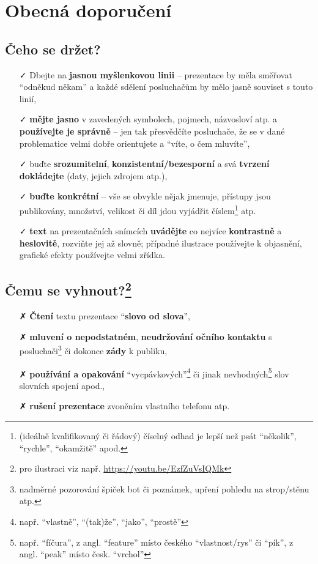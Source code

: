 \documentclass[a4paper,11pt, twoside]{report}
\begin{document}
\section{Obecná doporučení}

\raggedbottom

\subsection*{Čeho se držet?}

\begin{itemize}
\item[\faCheck]
Dbejte na \textbf{jasnou myšlenkovou linii} -- prezentace by měla směřovat ``odněkud někam'' a 
každé sdělení posluchačům by mělo jasně souviset s touto linií,
\item[\faCheck]
\textbf{mějte jasno} v zavedených symbolech, pojmech, názvosloví atp. a \textbf{používejte je správně} -- jen tak 
přesvědčíte posluchače, že se v dané problematice velmi dobře orientujete a ``víte, o čem mluvíte'',
\item[\faCheck]
buďte \textbf{srozumitelní}, \textbf{konzistentní/bezesporní} a svá \textbf{tvrzení dokládejte} (daty, jejich zdrojem atp.),
\item[\faCheck]
\textbf{buďte konkrétní} -- vše se obvykle nějak jmenuje, přístupy jsou publikovány, množství, velikost či díl jdou vyjádřit číslem\footnote{(ideálně kvalifikovaný či řádový) číselný odhad je lepší než psát ``několik'', ``rychle'', ``okamžitě'' apod.} atp.
\item[\faCheck]
\textbf{text} na prezentačních snímcích \textbf{uvádějte} co nejvíce \textbf{kontrastně} a \textbf{heslovitě}, rozviňte jej až slovně; případné 
ilustrace používejte k objasnění, grafické efekty používejte velmi zřídka.
\end{itemize}

\subsection*{Čemu se vyhnout?\footnote{pro ilustraci viz např. \url{https://youtu.be/EzfZuVsIQMk}}}

\begin{itemize}
\item[\faClose]
\textbf{Čtení} textu prezentace ``\textbf{slovo od slova}'',
\item[\faClose]
\textbf{mluvení o nepodstatném}, 
\textbf{neudržování očního kontaktu} s posluchači\footnote{nadměrné pozorování špiček bot či poznámek, upření pohledu na strop/stěnu atp.}
či dokonce
\textbf{zády} k publiku,
\item[\faClose]
\textbf{používání a opakování} ``vycpávkových''\footnote{např. ``vlastně'', ``(tak)že'', ``jako'', ``prostě''} či 
jinak nevhodných\footnote{např. ``fíčura'', z angl. ``feature'' místo českého ``vlastnost/rys'' či ``pík'', z angl. ``peak'' místo česk. ``vrchol''} slov 
slovních spojení apod.,
\item[\faClose]
\textbf{rušení prezentace} zvoněním vlastního telefonu atp.
\end{itemize}
\end{document}
